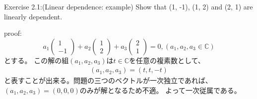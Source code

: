 \begin{flushleft}
{\Large Exercise 2.1:(Linear dependence: example) }
Show that (1, -1), (1, 2) and (2, 1) are linearly dependent.
\vspace{0.1in}

{\large proof:}
\begin{equation}
a_1\left(
	\begin{array}{c}
	1\\
	-1
	\end{array}
\right)
+ a_2\left(
	\begin{array}{c}
	1\\
	2
	\end{array}
\right)
+ a_3
\left(
	\begin{array}{c}
	2\\
	1
	\end{array}
\right)
= 0
, (a_1, a_2, a_3 \in \mathbb{C})
\end{equation}
とする。
\newline
この解の組$(a_1, a_2, a_3)$は$t\in \mathbb{C}$を任意の複素数として、
\begin{eqnarray}
(a_1, a_2, a_3) = (t, t, -t)
\end{eqnarray}
と表すことが出来る。問題の三つのベクトルが一次独立であれば、
$(a_1, a_2, a_3) = (0, 0, 0)$のみが解となるため不適。
よって一次従属である。
\end{flushleft}

